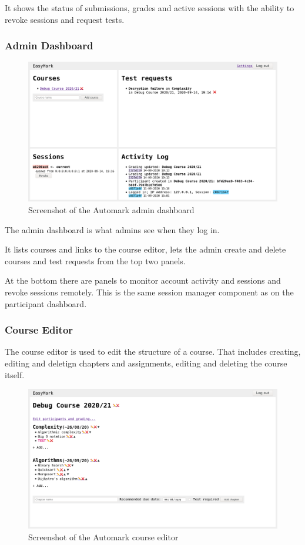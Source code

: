 \documentclass[12pt,a4paper,oneside]{report}
\begin{document}
	It shows the status of submissions, grades and active sessions with the ability to revoke sessions and request tests.

	\subsubsection{Admin Dashboard}
	\begin{figure}[H]
		\centering
		\includegraphics[width=\textwidth]{easymark_admin_dashboard.png}
		\caption{Screenshot of the Automark admin dashboard}
	\end{figure}

	The admin dashboard is what admins see when they log in.

	It lists courses and links to the course editor, lets the admin create and delete courses and test requests from the top two panels.

	At the bottom there are panels to monitor account activity and sessions and revoke sessions remotely. This is the same session manager component as on the participant dashboard.

	\pagebreak
	\subsubsection{Course Editor}
	The course editor is used to edit the structure of a course. That includes creating, editing and deletign chapters and assignments, editing and deleting the course itself.

	\begin{figure}[H]
		\centering
		\includegraphics[width={\textwidth}]{easymark_course_editor.png}
		\vskip0pt
		\caption{Screenshot of the Automark course editor}
	\end{figure}
\end{document}
